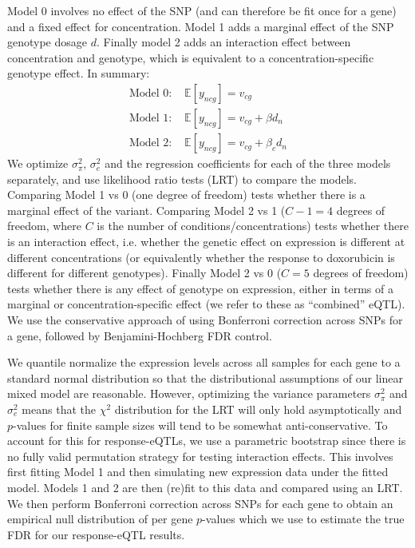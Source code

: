 \documentclass[9pt,lineno]{elife}
\begin{document}
Model 0 involves no effect of the SNP (and can therefore be fit once for a gene) and a fixed effect for concentration. Model 1 adds a marginal effect of the SNP genotype dosage $d$. Finally model 2 adds an interaction effect between concentration and genotype, which is equivalent to a concentration-specific genotype effect. In summary: 
\begin{align}
\text{Model 0: }& \mathbb{E}[ y_{ncg} ] = v_{cg} \\ 
\text{Model 1: }& \mathbb{E}[ y_{ncg} ] = v_{cg} + \beta d_n \\
\text{Model 2: }& \mathbb{E}[ y_{ncg} ] = v_{cg} + \beta_c d_n \label{eq:betac}
\end{align}
We optimize $\sigma^2_\pi$, $\sigma^2_e$ and the regression coefficients for each of the three models separately, and use likelihood ratio tests (LRT) to compare the models. Comparing Model 1 vs 0 (one degree of freedom) tests whether there is a marginal effect of the variant. Comparing Model 2 vs 1 ($C-1=4$ degrees of freedom, where $C$ is the number of conditions/concentrations) tests whether there is an interaction effect, i.e. whether the genetic effect on expression is different at different concentrations (or equivalently whether the response to doxorubicin is different for different genotypes). Finally Model 2 vs 0 ($C=5$ degrees of freedom) tests whether there is any effect of genotype on expression, either in terms of a marginal or concentration-specific effect (we refer to these as ``combined'' eQTL). We use the conservative approach of using Bonferroni correction across SNPs for a gene, followed by Benjamini-Hochberg FDR control. 

We quantile normalize the expression levels across all samples for each gene to a standard normal distribution so that the distributional assumptions of our linear mixed model are reasonable. However, optimizing the variance parameters $\sigma^2_\pi$ and $\sigma^2_e$ means that the $\chi^2$ distribution for the LRT will only hold asymptotically and $p$-values for finite sample sizes will tend to be somewhat anti-conservative. To account for this for response-eQTLs, we use a parametric bootstrap since there is no fully valid permutation strategy for testing interaction effects. This involves first fitting Model 1 and then simulating new expression data under the fitted model. Models 1 and 2 are then (re)fit to this data and compared using an LRT. We then perform Bonferroni correction across SNPs for each gene to obtain an empirical null distribution of per gene $p$-values which we use to estimate the true FDR for our response-eQTL results. 
\end{document}
